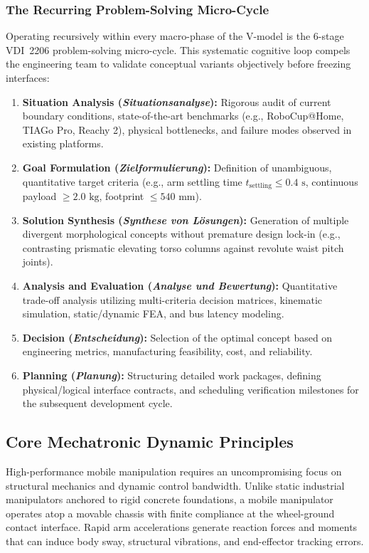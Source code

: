 \subsubsection{The Recurring Problem-Solving Micro-Cycle}
Operating recursively within every macro-phase of the V-model is the 6-stage VDI~2206 problem-solving micro-cycle. This systematic cognitive loop compels the engineering team to validate conceptual variants objectively before freezing interfaces:
\begin{enumerate}[leftmargin=1.5em]
  \item \textbf{Situation Analysis (\emph{Situationsanalyse}):} Rigorous audit of current boundary conditions, state-of-the-art benchmarks (e.g., RoboCup@Home, TIAGo Pro, Reachy 2), physical bottlenecks, and failure modes observed in existing platforms.
  \item \textbf{Goal Formulation (\emph{Zielformulierung}):} Definition of unambiguous, quantitative target criteria (e.g., arm settling time $t_{\text{settling}} \le 0.4\text{ s}$, continuous payload $\ge 2.0\text{ kg}$, footprint $\le 540\text{ mm}$).
  \item \textbf{Solution Synthesis (\emph{Synthese von L{\"o}sungen}):} Generation of multiple divergent morphological concepts without premature design lock-in (e.g., contrasting prismatic elevating torso columns against revolute waist pitch joints).
  \item \textbf{Analysis and Evaluation (\emph{Analyse und Bewertung}):} Quantitative trade-off analysis utilizing multi-criteria decision matrices, kinematic simulation, static/dynamic FEA, and bus latency modeling.
  \item \textbf{Decision (\emph{Entscheidung}):} Selection of the optimal concept based on engineering metrics, manufacturing feasibility, cost, and reliability.
  \item \textbf{Planning (\emph{Planung}):} Structuring detailed work packages, defining physical/logical interface contracts, and scheduling verification milestones for the subsequent development cycle.
\end{enumerate}

\subsection{Core Mechatronic Dynamic Principles}
High-performance mobile manipulation requires an uncompromising focus on structural mechanics and dynamic control bandwidth. Unlike static industrial manipulators anchored to rigid concrete foundations, a mobile manipulator operates atop a movable chassis with finite compliance at the wheel-ground contact interface. Rapid arm accelerations generate reaction forces and moments that can induce body sway, structural vibrations, and end-effector tracking errors.


